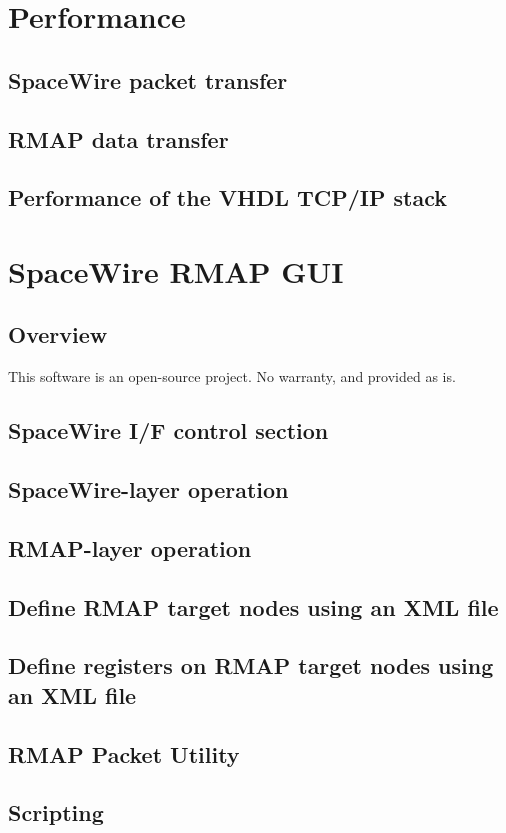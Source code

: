 \documentclass[a4paper,twoside,12pt]{book}
\begin{document}
\chapter{Performance}
\section{SpaceWire packet transfer}
\section{RMAP data transfer}
\section{Performance of the VHDL TCP/IP stack}

\chapter{SpaceWire RMAP GUI}
\section{Overview}
This software is an open-source project.
No warranty, and provided as is.
\section{SpaceWire I/F control section}
\section{SpaceWire-layer operation}
\section{RMAP-layer operation}
\section{Define RMAP target nodes using an XML file}
\section{Define registers on RMAP target nodes using an XML file}
\section{RMAP Packet Utility}
\section{Scripting}
\end{document}
